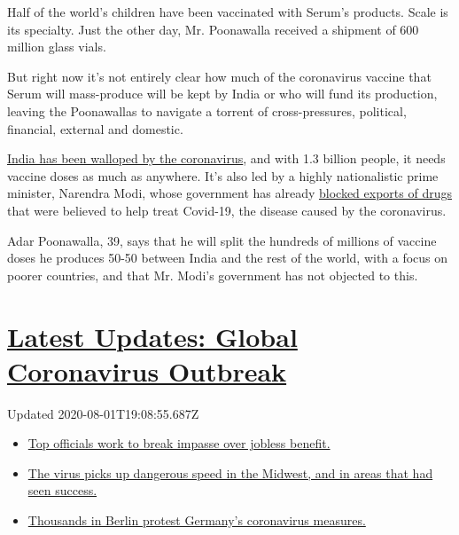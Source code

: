 Half of the world's children have been vaccinated with Serum's products.
Scale is its specialty. Just the other day, Mr. Poonawalla received a
shipment of 600 million glass vials.

But right now it's not entirely clear how much of the coronavirus
vaccine that Serum will mass-produce will be kept by India or who will
fund its production, leaving the Poonawallas to navigate a torrent of
cross-pressures, political, financial, external and domestic.

\href{https://www.nytimes3xbfgragh.onion/2020/07/16/world/asia/coronavirus-india-million-cases.html}{India
has been walloped by the coronavirus}, and with 1.3 billion people, it
needs vaccine doses as much as anywhere. It's also led by a highly
nationalistic prime minister, Narendra Modi, whose government has
already
\href{https://www.nytimes3xbfgragh.onion/2020/03/03/business/coronavirus-india-drugs.html}{blocked
exports of drugs} that were believed to help treat Covid-19, the disease
caused by the coronavirus.

Adar Poonawalla, 39, says that he will split the hundreds of millions of
vaccine doses he produces 50-50 between India and the rest of the world,
with a focus on poorer countries, and that Mr. Modi's government has not
objected to this.

\hypertarget{latest-updates-global-coronavirus-outbreak}{%
\section{\texorpdfstring{\href{https://www.nytimes3xbfgragh.onion/2020/08/01/world/coronavirus-covid-19.html?action=click\&pgtype=Article\&state=default\&region=MAIN_CONTENT_1\&context=storylines_live_updates}{Latest
Updates: Global Coronavirus
Outbreak}}{Latest Updates: Global Coronavirus Outbreak}}\label{latest-updates-global-coronavirus-outbreak}}

Updated 2020-08-01T19:08:55.687Z

\begin{itemize}
\tightlist
\item
  \href{https://www.nytimes3xbfgragh.onion/2020/08/01/world/coronavirus-covid-19.html?action=click\&pgtype=Article\&state=default\&region=MAIN_CONTENT_1\&context=storylines_live_updates\#link-3ac56579}{Top
  officials work to break impasse over jobless benefit.}
\item
  \href{https://www.nytimes3xbfgragh.onion/2020/08/01/world/coronavirus-covid-19.html?action=click\&pgtype=Article\&state=default\&region=MAIN_CONTENT_1\&context=storylines_live_updates\#link-8796723}{The
  virus picks up dangerous speed in the Midwest, and in areas that had
  seen success.}
\item
  \href{https://www.nytimes3xbfgragh.onion/2020/08/01/world/coronavirus-covid-19.html?action=click\&pgtype=Article\&state=default\&region=MAIN_CONTENT_1\&context=storylines_live_updates\#link-25930521}{Thousands
  in Berlin protest Germany's coronavirus measures.}
\end{itemize}

